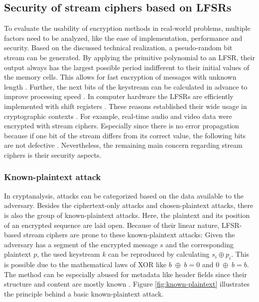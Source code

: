 \subsection{Security of stream ciphers based on LFSRs}

To evaluate the usability of encryption methods in real-world problems, multiple factors need to be analyzed, like the ease of implementation, performance and security. Based on the discussed technical realization, a pseudo-random bit stream can be generated. By applying the primitive polynomial to an LFSR, their output always has the largest possible period indifferent to their initial values of the memory cells. This allows for fast encryption of messages with unknown length \cite[p. 181]{Smart.2016}. Further, the next bits of the keystream can be calculated in advance to improve processing speed \cite[p. 3]{Robshaw.1995}. In computer hardware the LFSRs are efficiently implemented with shift registers \cite{Stamp.2007}. These reasons established their wide usage in cryptographic contexts \cite[p. 97]{Pommerening.2000}. For example, real-time audio and video data were encrypted with stream ciphers. Especially since there is no error propagation because if one bit of the stream differs from its correct value, the following bits are not defective \cite[p. 181]{Smart.2016}. Nevertheless, the remaining main concern regarding stream ciphers is their security aspects. 

\pagebreak

\subsubsection{Known-plaintext attack}

In cryptanalysis, attacks can be categorized based on the data available to the adversary. Besides the ciphertext-only attacks and chosen-plaintext attacks, there is also the group of known-plaintext attacks. Here, the plaintext and its position of an encrypted sequence are laid open. Because of their linear nature, LFSR-based stream ciphers are prone to these known-plaintext attacks: Given the adversary has a segment of the encrypted message $s$ and the corresponding plaintext $p$, the used keystream $k$ can be reproduced by calculating $s_i \oplus p_i$. This is possible due to the mathematical laws of XOR like $b\;\oplus\;b = 0$ \space and \space $0\;\oplus\;b = b$. The method can be especially abused for metadata like header fields since their structure and content are mostly known \cite[p. 359]{Eckert.2018}. Figure \ref{fig:known-plaintext} illustrates the principle behind a basic known-plaintext attack. \\

